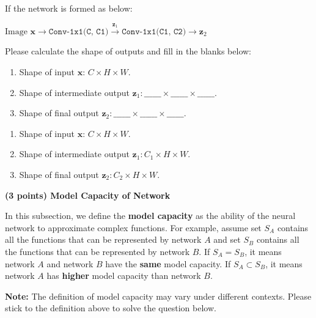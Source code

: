 \documentclass{article}
\newcommand{\x}{\mathbf{x}}
\newcommand{\z}{\mathbf{z}}
\begin{document}
\begin{probset}
\begin{prob}
\begin{subprobset}
\begin{subprob}
        If the network is formed as below:
        \begin{center}
            $\text{Image } \x \to \texttt{Conv-1x1(C, C1)} \xrightarrow{\z_1} \texttt{Conv-1x1(C1, C2)} \to \z_2$
        \end{center}
        
        Please calculate the shape of outputs and fill in the blanks below:

        \begin{enumerate}
            \item Shape of input $\x$: $C \times H \times W$.
            \item Shape of intermediate output $\z_1: \_\_\_\_\_\_ \times \_\_\_\_\_\_ \times \_\_\_\_\_\_$.
            \item Shape of final output $\z_2: \_\_\_\_\_\_ \times \_\_\_\_\_\_ \times \_\_\_\_\_\_$.
        \end{enumerate}

        \begin{soln}
            \begin{enumerate}
                \item Shape of input $\x$: $C \times H \times W$.
                \item Shape of intermediate output $\z_1: C_1 \times H \times W$.
                \item Shape of final output $\z_2: C_2 \times H \times W$.
            \end{enumerate}
        \end{soln}
    \end{subprob}

    \begin{subprob}
        \textbf{(3 points) Model Capacity of Network}

        In this subsection, we define the \textbf{model capacity} as the ability of the neural network to approximate complex functions. For example, assume set $S_A$ contains all the functions that can be represented by network $A$ and set $S_B$ contains all the functions that can be represented by network $B$. If $S_A = S_B$, it means network $A$ and network $B$ have the \textbf{same} model capacity. If $S_A \subset S_B$, it means network $A$ has \textbf{higher} model capacity than network $B$.

        \textbf{Note:} The definition of model capacity may vary under different contexts. Please stick to the definition above to solve the question below.


\end{subprob}
\end{subprobset}
\end{prob}
\end{probset}
\end{document}
